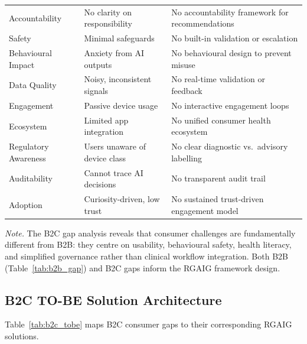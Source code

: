{\begin{xltabular}{\textwidth}{@{} >{\raggedright\arraybackslash}p{3.2cm} L L @{}}
\addlinespace
Accountability & No clarity on responsibility & No accountability framework for recommendations \\
\addlinespace
Safety & Minimal safeguards & No built-in validation or escalation \\
\addlinespace
Behavioural Impact & Anxiety from AI outputs & No behavioural design to prevent misuse \\
\addlinespace
Data Quality & Noisy, inconsistent signals & No real-time validation or feedback \\
\addlinespace
Engagement & Passive device usage & No interactive engagement loops \\
\addlinespace
Ecosystem & Limited app integration & No unified consumer health ecosystem \\
\addlinespace
Regulatory Awareness & Users unaware of device class & No clear diagnostic vs.\ advisory labelling \\
\addlinespace
Auditability & Cannot trace AI decisions & No transparent audit trail \\
\addlinespace
Adoption & Curiosity-driven, low trust & No sustained trust-driven engagement model \\
\end{xltabular}}
\vspace{0.5em}
\noindent\textit{Note.} The B2C gap analysis reveals that consumer challenges are fundamentally different from B2B: they centre on usability, behavioural safety, health literacy, and simplified governance rather than clinical workflow integration. Both B2B (Table~\ref{tab:b2b_gap}) and B2C gaps inform the RGAIG framework design.
\fi


\iffalse %
\subsection{B2C TO-BE Solution Architecture}
\label{sec:b2c_tobe}

Table~\ref{tab:b2c_tobe} maps B2C consumer gaps to their corresponding RGAIG solutions.



